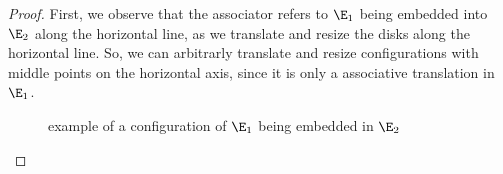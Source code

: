 \begin{proof}
    First, we observe that the associator refers to $\E_1$ being embedded into $\E_2$ along the horizontal line,
    as we translate and resize the disks along the horizontal line.
    So, we can arbitrarly translate and resize configurations with middle points on the horizontal axis,
    since it is only a associative translation in $\E_1$. 

    \begin{figure}[h!]
        \begin{center}
        \end{center}
        \caption{example of a configuration of $\E_1$ being embedded in $\E_2$}
    \end{figure}


\end{proof}
